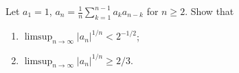 \documentclass{article}
\begin{document}
	\setlength{\parindent}{0pt}
	Let $a_1=1$, $a_n=\frac{1}{n}\sum_{k=1}^{n-1}a_ka_{n-k}$ for $n\geq 2$. Show that
	\begin{enumerate}[label=(\roman*)]
		\item $\limsup_{n\to\infty}\lvert a_n\rvert^{1/n}<2^{-1/2}$;
		\item $\limsup_{n\to\infty}\lvert a_n\rvert^{1/n}\geq 2/3$.
	\end{enumerate}
\end{document}

